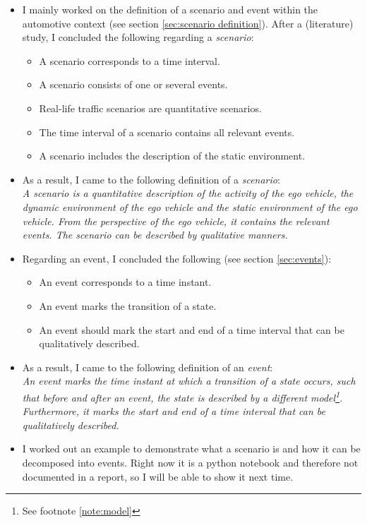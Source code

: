 \documentclass[10pt,final,a4paper,oneside,onecolumn]{article}
\begin{document}
\begin{itemize}
	\item I mainly worked on the definition of a scenario and event within the automotive context (see section \ref{sec:scenario definition}). After a (literature) study, I concluded the following regarding a \emph{scenario}:
	\begin{itemize}
		\item A scenario corresponds to a time interval. 
		\item A scenario consists of one or several events.
		\item Real-life traffic scenarios are quantitative scenarios.
		\item The time interval of a scenario contains all relevant events.
		\item A scenario includes the description of the static environment.
	\end{itemize}
	\item As a result, I came to the following definition of a \emph{scenario}: \\
	\emph{A scenario is a quantitative description of the activity of the ego vehicle, the dynamic environment of the ego vehicle and the static environment of the ego vehicle. From the perspective of the ego vehicle, it contains the relevant events. The scenario can be described by qualitative manners.}
	\item Regarding an event, I concluded the following (see section \ref{sec:events}):
	\begin{itemize}
		\item An event corresponds to a time instant.
		\item An event marks the transition of a state.
		\item An event should mark the start and end of a time interval that can be qualitatively described.
	\end{itemize}
	\item As a result, I came to the following definition of an \emph{event}: \\
	\emph{An event marks the time instant at which a transition of a state occurs, such that before and after an event, the state is described by a different model\footnote{See footnote \ref{note:model}}. Furthermore, it marks the start and end of a time interval that can be qualitatively described.}
	\item I worked out an example to demonstrate what a scenario is and how it can be decomposed into events. Right now it is a python notebook and therefore not documented in a report, so I will be able to show it next time.
\end{itemize}
\end{document}
